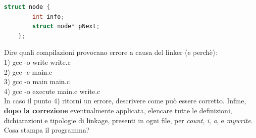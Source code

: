 \begin{questions}
\begin{minipage}[t]{0.4\linewidth}
\begin{lstlisting}[language=C]
	struct node {
		int info;
		struct node* pNext;
	};
	\end{lstlisting}
\end{minipage}
\begin{minipage}[t]{0.6\linewidth}
\end{minipage}


\newpage

\begin{center}
\end{center}

\vspace{5mm}

\noindent{}



\question[7]
Dire quali compilazioni provocano errore a causa del linker (e perchè):\\
1) gcc -o write write.c\\
2) gcc -c main.c\\
3) gcc -o main main.c\\
4) gcc -o execute main.c write.c\\
In caso il punto 4) ritorni un errore, descrivere come può essere corretto. Infine, \textbf{dopo la correzione} eventualmente applicata, elencare tutte le definizioni, dichiarazioni e tipologie di linkage, presenti in ogni file, per \emph{count}, \emph{i}, \emph{a}, e \emph{mywrite}. Cosa stampa il programma?


\end{questions}
